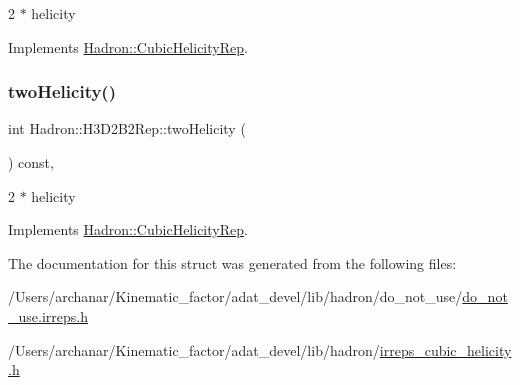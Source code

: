 2 $\ast$ helicity 

Implements \mbox{\hyperlink{structHadron_1_1CubicHelicityRep_af507aa56fc2747eacc8cb6c96db31ecc}{Hadron\+::\+Cubic\+Helicity\+Rep}}.

\mbox{\label{structHadron_1_1H3D2B2Rep_ad64aabbb6d77c697acb2c327018ecfea}} 
\subsubsection{\texorpdfstring{twoHelicity()}{twoHelicity()}\hspace{0.1cm}{\footnotesize\ttfamily [2/2]}}
{\footnotesize\ttfamily int Hadron\+::\+H3\+D2\+B2\+Rep\+::two\+Helicity (\begin{DoxyParamCaption}{ }\end{DoxyParamCaption}) const\hspace{0.3cm}{\ttfamily [inline]}, {\ttfamily [virtual]}}

2 $\ast$ helicity 

Implements \mbox{\hyperlink{structHadron_1_1CubicHelicityRep_af507aa56fc2747eacc8cb6c96db31ecc}{Hadron\+::\+Cubic\+Helicity\+Rep}}.



The documentation for this struct was generated from the following files\+:\begin{DoxyCompactItemize}
\item 
/\+Users/archanar/\+Kinematic\+\_\+factor/adat\+\_\+devel/lib/hadron/do\+\_\+not\+\_\+use/\mbox{\hyperlink{do__not__use_8irreps_8h}{do\+\_\+not\+\_\+use.\+irreps.\+h}}\item 
/\+Users/archanar/\+Kinematic\+\_\+factor/adat\+\_\+devel/lib/hadron/\mbox{\hyperlink{lib_2hadron_2irreps__cubic__helicity_8h}{irreps\+\_\+cubic\+\_\+helicity.\+h}}\end{DoxyCompactItemize}
